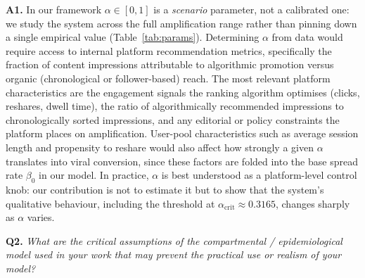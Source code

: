 \documentclass[11pt]{article}
\begin{document}
\medskip
\noindent\textbf{A1.}
In our framework $\alpha \in [0,1]$ is a \emph{scenario} parameter, not a calibrated one: we study the system across the full amplification range rather than pinning down a single empirical value (Table~\ref{tab:params}).
Determining $\alpha$ from data would require access to internal platform recommendation metrics, specifically the fraction of content impressions attributable to algorithmic promotion versus organic (chronological or follower-based) reach.
The most relevant platform characteristics are the engagement signals the ranking algorithm optimises (clicks, reshares, dwell time), the ratio of algorithmically recommended impressions to chronologically sorted impressions, and any editorial or policy constraints the platform places on amplification.
User-pool characteristics such as average session length and propensity to reshare would also affect how strongly a given $\alpha$ translates into viral conversion, since these factors are folded into the base spread rate $\beta_0$ in our model.
In practice, $\alpha$ is best understood as a platform-level control knob: our contribution is not to estimate it but to show that the system's qualitative behaviour, including the threshold at $\alpha_{\mathrm{crit}} \approx 0.3165$, changes sharply as $\alpha$ varies.

\bigskip

\noindent\textbf{Q2.} \textit{What are the critical assumptions of the compartmental / epidemiological model used in your work that may prevent the practical use or realism of your model?}
\end{document}

